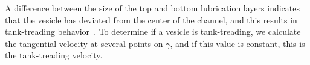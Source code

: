 \documentclass[twoside,twocolumn,9pt]{article}
\newcommand{\subfigimg}[3][,]{%
  \setbox1=\hbox{\texttt{[image: \#3]}}%
  \leavevmode\rlap{\usebox1}%
  \rlap{\hspace*{0pt}\raisebox{\dimexpr\ht1-0\baselineskip}{\bf
  \normalsize #2}}%
  \phantom{\usebox1}%
}
\begin{document}

A difference between the size of the top and bottom lubrication layers
indicates that the vesicle  has deviated from the center of the channel,
and this results in tank-treading behavior~\cite{aga-bir2020}.  To
determine if a vesicle is tank-treading, we calculate the tangential
velocity at several points on $\gamma$, and if this value is constant,
this is the tank-treading velocity.

\end{document}

